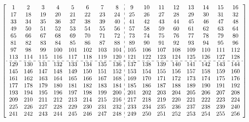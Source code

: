 \documentclass{article}
\begin{document}
$$
\left[
\begin{array}{cccccccc:cccccccc}
  1 &  2 &  3 &  4 &  5 &  6 &  7 &  8 &  9 & 10 & 11 & 12 & 13 & 14 & 15 & 16 \\
 17 & 18 & 19 & 20 & 21 & 22 & 23 & 24 & 25 & 26 & 27 & 28 & 29 & 30 & 31 & 32 \\
 33 & 34 & 35 & 36 & 37 & 38 & 39 & 40 & 41 & 42 & 43 & 44 & 45 & 46 & 47 & 48 \\
 49 & 50 & 51 & 52 & 53 & 54 & 55 & 56 & 57 & 58 & 59 & 60 & 61 & 62 & 63 & 64 \\
 65 & 66 & 67 & 68 & 69 & 70 & 71 & 72 & 73 & 74 & 75 & 76 & 77 & 78 & 79 & 80 \\
 81 & 82 & 83 & 84 & 85 & 86 & 87 & 88 & 89 & 90 & 91 & 92 & 93 & 94 & 95 & 96 \\
 97 & 98 & 99 &100 &101 &102 &103 &104 &105 &106 &107 &108 &109 &110 &111 &112 \\
113 &114 &115 &116 &117 &118 &119 &120 &121 &122 &123 &124 &125 &126 &127 &128 \\ \hdashline
129 &130 &131 &132 &133 &134 &135 &136 &137 &138 &139 &140 &141 &142 &143 &144 \\
145 &146 &147 &148 &149 &150 &151 &152 &153 &154 &155 &156 &157 &158 &159 &160 \\
161 &162 &163 &164 &165 &166 &167 &168 &169 &170 &171 &172 &173 &174 &175 &176 \\
177 &178 &179 &180 &181 &182 &183 &184 &185 &186 &187 &188 &189 &190 &191 &192 \\
193 &194 &195 &196 &197 &198 &199 &200 &201 &202 &203 &204 &205 &206 &207 &208 \\
209 &210 &211 &212 &213 &214 &215 &216 &217 &218 &219 &220 &221 &222 &223 &224 \\
225 &226 &227 &228 &229 &230 &231 &232 &233 &234 &235 &236 &237 &238 &239 &240 \\
241 &242 &243 &244 &245 &246 &247 &248 &249 &250 &251 &252 &253 &254 &255 &256
\end{array}
\right]
$$
\end{document}

